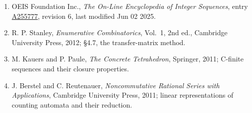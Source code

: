\documentclass[11pt]{article}
\theoremstyle{definition}
\begin{document}
\begin{enumerate}

\item OEIS Foundation Inc., \emph{The On-Line Encyclopedia of Integer Sequences}, entry \href{https://oeis.org/A255777}{A255777}, revision 6, last modified Jun 02 2025.

\item R. P. Stanley, \emph{Enumerative Combinatorics}, Vol.~1, 2nd ed., Cambridge University Press, 2012; \S4.7, the transfer-matrix method.

\item M. Kauers and P. Paule, \emph{The Concrete Tetrahedron}, Springer, 2011; C-finite sequences and their closure properties.

\item J. Berstel and C. Reutenauer, \emph{Noncommutative Rational Series with Applications}, Cambridge University Press, 2011; linear representations of counting automata and their reduction.

\end{enumerate}
\end{document}
